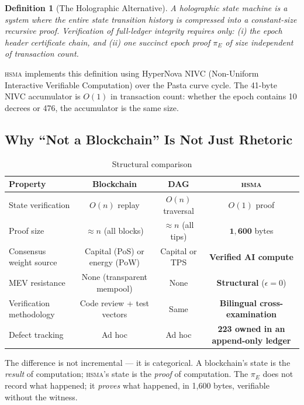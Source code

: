 \documentclass[11pt, a4paper]{article}
\newtheorem{definition}[theorem]{Definition}
\newcommand{\hsma}{\textsc{hsma}}
\begin{document}
\begin{definition}[The Holographic Alternative]
A \emph{holographic state machine} is a system where the entire state transition history is compressed into a \emph{constant-size recursive proof}. Verification of full-ledger integrity requires only: (i) the epoch header certificate chain, and (ii) one succinct epoch proof $\pi_E$ of size independent of transaction count.
\end{definition}

\hsma{} implements this definition using HyperNova NIVC (Non-Uniform Interactive Verifiable Computation) over the Pasta curve cycle. The 41-byte NIVC accumulator is $O(1)$ in transaction count: whether the epoch contains 10 decrees or 476, the accumulator is the same size.

\subsection{Why ``Not a Blockchain'' Is Not Just Rhetoric}

\begin{table}[h]
\centering
\caption{Structural comparison}
\begin{tabular}{lccc}
\toprule
\textbf{Property} & \textbf{Blockchain} & \textbf{DAG} & \textbf{\hsma{}} \\
\midrule
State verification & $O(n)$ replay & $O(n)$ traversal & $O(1)$ proof \\
Proof size & $\approx n$ (all blocks) & $\approx n$ (all tips) & $\mathbf{1{,}600}$ bytes \\
Consensus weight source & Capital (PoS) or energy (PoW) & Capital or TPS & \textbf{Verified AI compute} \\
MEV resistance & None (transparent mempool) & None & \textbf{Structural} ($\epsilon{=}0$) \\
Verification methodology & Code review + test vectors & Same & \textbf{Bilingual cross-examination} \\
Defect tracking & Ad hoc & Ad hoc & \textbf{223 owned in an append-only ledger} \\
\bottomrule
\end{tabular}
\end{table}

The difference is not incremental --- it is categorical. A blockchain's state is the \emph{result} of computation; \hsma{}'s state is the \emph{proof} of computation. The $\pi_E$ does not record what happened; it \emph{proves} what happened, in 1,600 bytes, verifiable without the witness.
\end{document}
